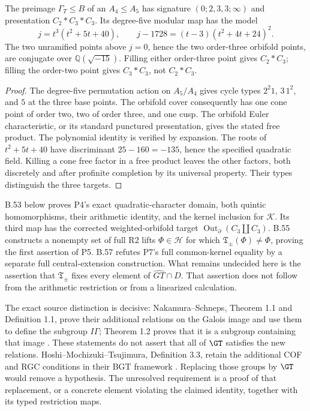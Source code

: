 The preimage \(\Gamma_T\leq B\) of an \(A_4\leq A_5\) has
signature \((0;2,3,3;\infty)\) and presentation
\(C_2*C_3*C_3\). Its degree-five modular map has the model
\[
 j=t^3(t^2+5t+40),\qquad
 j-1728=(t-3)(t^2+4t+24)^2.
\]
The two unramified points above \(j=0\), hence the two order-three
orbifold points, are conjugate over \(\mathbb Q(\sqrt{-15})\).
Filling either order-three point gives \(C_2*C_3\); filling the
order-two point gives \(C_3*C_3\), not \(C_2*C_3\).
\begin{proof}
The degree-five permutation action on \(A_5/A_4\) gives cycle
types \(2^2 1\), \(3\,1^2\), and \(5\) at the three base
points. The orbifold cover consequently has one cone point of
order two, two of order three, and one cusp. The orbifold Euler
characteristic, or its standard punctured presentation, gives the
stated free product. The polynomial identity is verified by
expansion. The roots of \(t^2+5t+40\) have discriminant
\(25-160=-135\), hence the specified quadratic field.
Killing a cone free factor in a free product leaves the other
factors, both discretely and after profinite completion by its
universal property. Their types distinguish the three targets.
\end{proof}

B.53 below proves P4's exact quadratic-character domain, both
quintic homomorphisms, their arithmetic identity, and the kernel
inclusion for $\mathcal K$. Its third map has the corrected
weighted-orbifold target $\operatorname{Out}_{\partial}(C_3\amalg C_3)$.
B.55 constructs a nonempty set of full R2 lifts $\Phi\in\mathcal H$
for which $\mathfrak T_\pm(\Phi)\ne\Phi$, proving the first
assertion of P5. B.57 refutes P7's full common-kernel equality
by a separate full central-extension construction.
What remains undecided here is the assertion that
$\mathfrak T_\pm$ fixes every element of $\widehat{GT}\cap D$.
That assertion does not follow from the arithmetic restriction
or from a linearized calculation.

The exact source distinction is decisive: Nakamura--Schneps,
Theorem 1.1 and Definition 1.1, prove their additional relations
on the Galois image and use them to define the subgroup
\(I\Gamma\); Theorem 1.2 proves that it is a subgroup containing
that image \citep{NakamuraSchneps2000}. These statements do not
assert that all of \(\GT\) satisfies the new relations.
Hoshi--Mochizuki--Tsujimura, Definition 3.3, retain the additional
COF and RGC conditions in their BGT framework
\citep{HoshiMochizukiTsujimura2025}. Replacing those groups by
\(\GT\) would remove a hypothesis. The unresolved requirement
is a proof of that replacement, or a concrete element violating
the claimed identity, together with its typed restriction maps.

